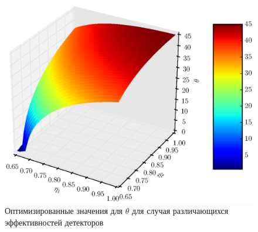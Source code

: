 \documentclass[%
master,         %
subf,           %
href,           %
colorlinks=true %
]{disser}
\numberwithin{equation}{section}
\numberwithin{figure}{section}
\begin{document}
\begin{figure}[h]
\includegraphics[scale=0.7]{theta3d.eps}
\caption{Оптимизированные значения для $\theta$ для случая различающихся эффективностей детекторов}
\label{fig:theta_opt_3d}
\end{figure}
\end{document}
